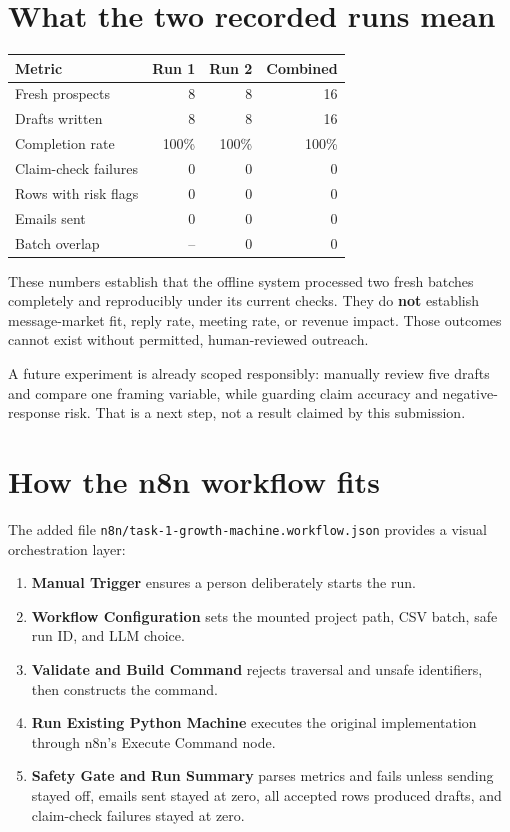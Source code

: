 \documentclass[11pt,a4paper]{article}
\newcommand{\pathcode}[1]{\texttt{#1}}
\begin{document}
\section{What the two recorded runs mean}

\begin{tabular}{lrrr}
\toprule
Metric & Run 1 & Run 2 & Combined \\
\midrule
Fresh prospects & 8 & 8 & 16 \\
Drafts written & 8 & 8 & 16 \\
Completion rate & 100\% & 100\% & 100\% \\
Claim-check failures & 0 & 0 & 0 \\
Rows with risk flags & 0 & 0 & 0 \\
Emails sent & 0 & 0 & 0 \\
Batch overlap & -- & 0 & 0 \\
\bottomrule
\end{tabular}

These numbers establish that the offline system processed two fresh batches completely and reproducibly under its current checks. They do \textbf{not} establish message-market fit, reply rate, meeting rate, or revenue impact. Those outcomes cannot exist without permitted, human-reviewed outreach.

A future experiment is already scoped responsibly: manually review five drafts and compare one framing variable, while guarding claim accuracy and negative-response risk. That is a next step, not a result claimed by this submission.

\section{How the n8n workflow fits}

The added file \pathcode{n8n/task-1-growth-machine.workflow.json} provides a visual orchestration layer:

\begin{enumerate}
  \item \textbf{Manual Trigger} ensures a person deliberately starts the run.
  \item \textbf{Workflow Configuration} sets the mounted project path, CSV batch, safe run ID, and LLM choice.
  \item \textbf{Validate and Build Command} rejects traversal and unsafe identifiers, then constructs the command.
  \item \textbf{Run Existing Python Machine} executes the original implementation through n8n's Execute Command node.
  \item \textbf{Safety Gate and Run Summary} parses metrics and fails unless sending stayed off, emails sent stayed at zero, all accepted rows produced drafts, and claim-check failures stayed at zero.
\end{enumerate}
\end{document}
